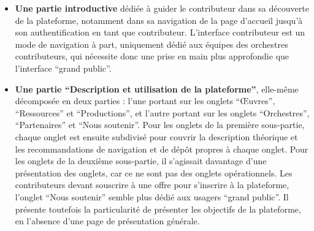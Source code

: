 \begin{itemize}
	\item \textbf{Une partie introductive} dédiée à guider le contributeur dans sa découverte de la plateforme, notamment dans sa navigation de la page d'accueil jusqu'à son authentification en tant que contributeur. L'interface contributeur est un mode de navigation à part, uniquement dédié aux équipes des orchestres contributeurs, qui nécessite donc une prise en main plus approfondie que l'interface \enquote{grand public}.
	\item \textbf{Une partie \enquote{Description et utilisation de la plateforme}}, elle-même décomposée en deux parties : l'une portant sur les onglets \enquote{Œuvres}, \enquote{Ressources} et \enquote{Productions}, et l'autre portant sur les onglets \enquote{Orchestres}, \enquote{Partenaires} et \enquote{Nous soutenir}. Pour les onglets de la première sous-partie, chaque onglet est ensuite subdivisé pour couvrir la description théorique et les recommandations de navigation et de dépôt propres à chaque onglet. Pour les onglets de la deuxième sous-partie, il s'agissait davantage d'une présentation des onglets, car ce ne sont pas des onglets opérationnels. Les contributeurs devant souscrire à une offre pour s'inscrire à la plateforme, l'onglet \enquote{Nous soutenir} semble plus dédié aux usagers \enquote{grand public}. Il présente toutefois la particularité de présenter les objectifs de la plateforme, en l'absence d'une page de présentation générale.
\end{itemize}

